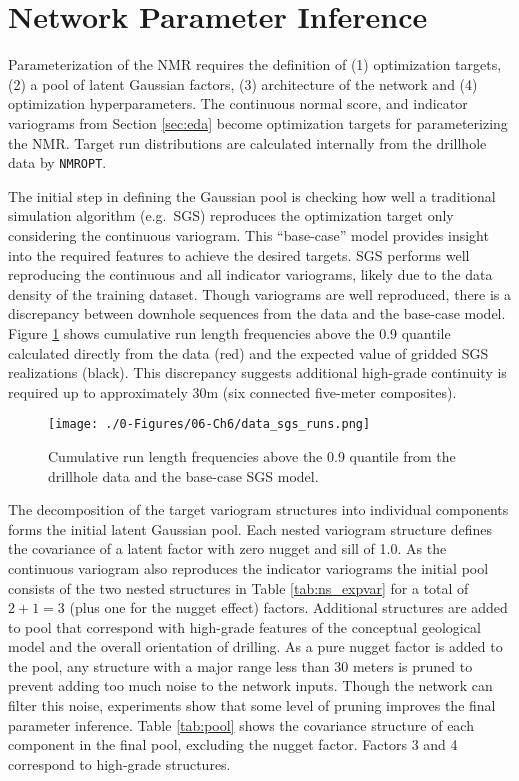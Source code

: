 \section{Network Parameter Inference}
\label{sec:param}

Parameterization of the \gls{NMR} requires the definition of (1) optimization targets, (2) a pool of latent Gaussian factors, (3) architecture of the network and (4) optimization hyperparameters. The continuous normal score, and indicator variograms from Section \ref{sec:eda} become optimization targets for parameterizing the \gls{NMR}. Target run distributions are calculated internally from the drillhole data by \texttt{NMROPT}.

The initial step in defining the Gaussian pool is checking how well a traditional simulation algorithm (e.g.\ \gls{SGS}) reproduces the optimization target only considering the continuous variogram. This ``base-case'' model provides insight into the required features to achieve the desired targets. \Gls{SGS} performs well reproducing the continuous and all indicator variograms, likely due to the data density of the training dataset. Though variograms are well reproduced, there is a discrepancy between downhole sequences from the data and the base-case model. Figure \ref{fig:data_sgs_runs} shows cumulative run length frequencies above the 0.9 quantile calculated directly from the data (red) and the expected value of gridded \gls{SGS} realizations (black). This discrepancy suggests additional high-grade continuity is required up to approximately 30m (six connected five-meter composites).

\begin{figure}[htb!]
    \centering
    \texttt{[image: ./0-Figures/06-Ch6/data\_sgs\_runs.png]}
    \caption{Cumulative run length frequencies above the 0.9 quantile from the drillhole data and the base-case \gls{SGS} model.}
    \label{fig:data_sgs_runs}
\end{figure}

The decomposition of the target variogram structures into individual components forms the initial latent Gaussian pool. Each nested variogram structure defines the covariance of a latent factor with zero nugget and sill of 1.0. As the continuous variogram also reproduces the indicator variograms the initial pool consists of the two nested structures in Table \ref{tab:ns_expvar} for a total of $2 + 1 = 3$ (plus one for the nugget effect) factors. Additional structures are added to pool that correspond with high-grade features of the conceptual geological model and the overall orientation of drilling. As a pure nugget factor is added to the pool, any structure with a major range less than 30 meters is pruned to prevent adding too much noise to the network inputs. Though the network can filter this noise, experiments show that some level of pruning improves the final parameter inference. Table \ref{tab:pool} shows the covariance structure of each component in the final pool, excluding the nugget factor. Factors 3 and 4 correspond to high-grade structures.


